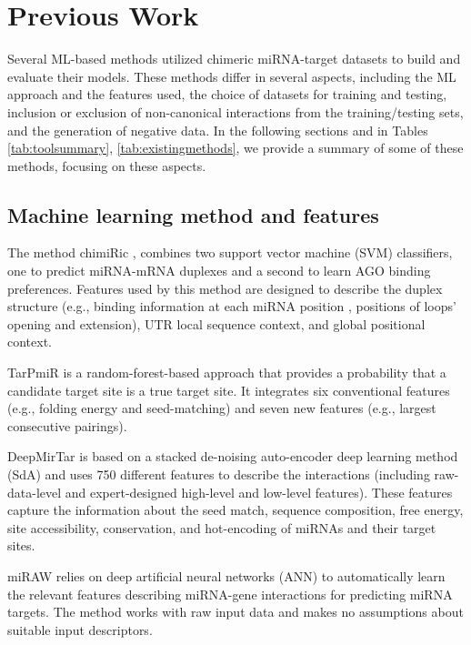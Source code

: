 \chapter{Previous Work}
\label{chap:pw}

Several ML-based methods utilized chimeric miRNA-target datasets to build and evaluate their models. These methods differ in several aspects, including the ML approach and the features used, the choice of datasets for training and testing, inclusion or exclusion of non-canonical interactions from the training/testing sets, and the generation of negative data. In the following sections and in Tables \ref{tab:toolsummary}, \ref{tab:existingmethods}, we provide a summary of some of these methods, focusing on these aspects.

\section{Machine learning method and features}
The method chimiRic \cite{lu2016learning}, combines two support vector machine (SVM) classifiers, one to predict miRNA-mRNA duplexes and a second to learn AGO binding preferences. Features used by this method are designed to describe the duplex structure (e.g., binding information at each miRNA position \cite{khorshid2013biophysical}, positions of loops' opening and extension), UTR local sequence context, and global positional context. 

TarPmiR \cite{ding2016tarpmir} is a random-forest-based approach that provides a probability that a candidate target site is a true target site. It integrates six conventional features (e.g., folding energy and seed-matching) and seven new features (e.g., largest consecutive pairings).

DeepMirTar \cite{wen2018deepmirtar} is based on a stacked de-noising auto-encoder deep learning method (SdA) and uses 750 different features to describe the interactions (including raw-data-level and expert-designed high-level and low-level features). These features capture the information about the seed match, sequence composition, free energy, site accessibility, conservation, and hot-encoding of miRNAs and their target sites. 

miRAW \cite{pla2018miraw} relies on deep artificial neural networks (ANN) to automatically learn the relevant features describing miRNA-gene interactions for predicting miRNA targets. The method works with raw input data and makes no assumptions about suitable input descriptors. 

